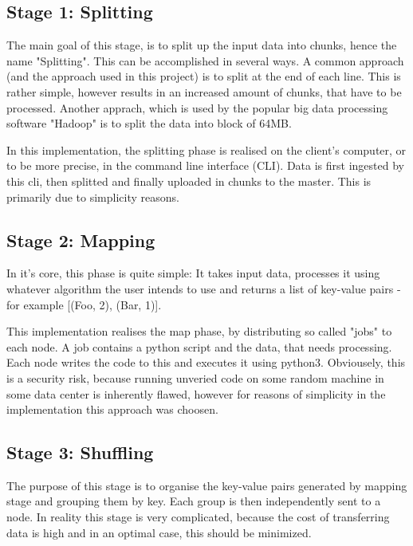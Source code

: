\documentclass[a4paper]{article}
\begin{document}
\hypertarget{stage-1-splitting}{%
\subsection{Stage 1: Splitting}\label{stage-1-splitting}}

The main goal of this stage, is to split up the input data into chunks, hence the name "Splitting". This can be accomplished in several ways. A common approach (and the approach used in this project) is to split at the end of each line. This is rather simple, however results in an increased amount of chunks, that have to be processed. Another apprach, which is used by the popular big data processing software "Hadoop" is to split the data into block of 64MB.

In this implementation, the splitting phase is realised on the client's computer, or to be more precise, in the command line interface (CLI). Data is first ingested by this cli, then splitted and finally uploaded in chunks to the master. This is primarily due to simplicity reasons.

\hypertarget{stage-2-mapping}{%
\subsection{Stage 2: Mapping}\label{stage-2-mapping}}

In it's core, this phase is quite simple: It takes input data, processes it using whatever algorithm the user intends to use and returns a list of key-value pairs - for example [(Foo, 2), (Bar, 1)].

This implementation realises the map phase, by distributing so called "jobs" to each node. A job contains a python script and the data, that needs processing. Each node writes the code to this and executes it using python3. Obviousely, this is a security risk, because running unveried code on some random machine in some data center is inherently flawed, however for reasons of simplicity in the implementation this approach was choosen.

\hypertarget{stage-3-shuffling}{%
\subsection{Stage 3: Shuffling}\label{stage-3-shuffling}}

The purpose of this stage is to organise the key-value pairs generated by mapping stage and grouping them by key. Each group is then independently sent to a node. In reality this stage is very complicated, because the cost of transferring data is high and in an optimal case, this should be minimized.
\end{document}
